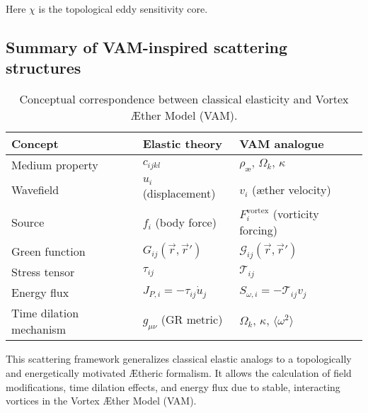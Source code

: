 Here \(\chi\) is the topological eddy sensitivity core.
\subsection{Summary of VAM-inspired scattering structures}

\begin{table}[htbp]
    \centering
    \begin{tabular}{lll}
        \toprule
    \textbf{Concept} & \textbf{Elastic theory} & \textbf{VAM analogue} \\
    \midrule
    Medium property & \( c_{ijkl} \) & \( \rho_\text{\ae},\, \Omega_k,\, \kappa \) \\
    Wavefield & \( u_i \) (displacement) & \( v_i \) (æther velocity) \\
    Source & \( f_i \) (body force) & \( F_i^\text{vortex} \) (vorticity forcing) \\
    Green function & \( G_{ij}(\vec{r}, \vec{r}') \) & \( \mathcal{G}_{ij}(\vec{r}, \vec{r}') \) \\
    Stress tensor & \( \tau_{ij} \) & \( \mathcal{T}_{ij} \) \\
    Energy flux & \( J_{P,i} = -\tau_{ij} \dot{u}_j \) & \( S_{\omega,i} = -\mathcal{T}_{ij} v_j \) \\
    Time dilation mechanism & \( g_{\mu\nu} \) (GR metric) & \( \Omega_k,\, \kappa,\, \langle \omega^2 \rangle \) \\
    \bottomrule
    \end{tabular}
    \caption{Conceptual correspondence between classical elasticity and Vortex Æther Model (VAM).}
    \label{tab:elastic-vam-analogy}
\end{table}

This scattering framework generalizes classical elastic analogs to a topologically and energetically motivated Ætheric formalism. It allows the calculation of field modifications, time dilation effects, and energy flux due to stable, interacting vortices in the Vortex Æther Model (VAM).

